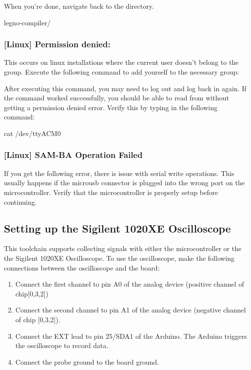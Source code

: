 When you're done, navigate back to the  directory.

\begin{snippet}
  legno-compiler/
\end{snippet}


\subsubsection{[Linux] Permission denied: }

This occurs on linux installations where the current user doesn't belong to the
 group. Execute the following command to add yourself to the
necessary group:


After executing this command, you may need to log out and log back in again. If
the command worked successfully, you should be able to read from
 without getting a permission denied error. Verify this by
typing in the following command:

\begin{snippet}
cat /dev/ttyACM0
\end{snippet}

\subsubsection{[Linux] SAM-BA Operation Failed}

If you get the following error, there is issue with serial write operations.
This usually happens if the microusb connector is plugged into the wrong port
on the microcontroller. Verify that the microcontroller is properly setup
before continuing.

\subsection{Setting up the Sigilent 1020XE Oscilloscope}\label{sec:setup-osc}

This toolchain supports collecting signals with either the microcontroller or
the the Sigilent 1020XE Oscilloscope. To use the oscilloscope, make the following connections
between the oscilloscope and the board:

\begin{enumerate}
  \item Connect the first channel to pin A0 of the analog device (positive channel of
    chip[0,3,2])
  \item Connect the second channel to pin A1 of the analog device (negative channel of chip
    [0,3,2]).
  \item Connect the EXT lead to pin 25/SDA1 of the Arduino. The Arduino triggers the
    oscilloscope to record data.
  \item Connect the probe ground to the board ground.
\end{enumerate}

